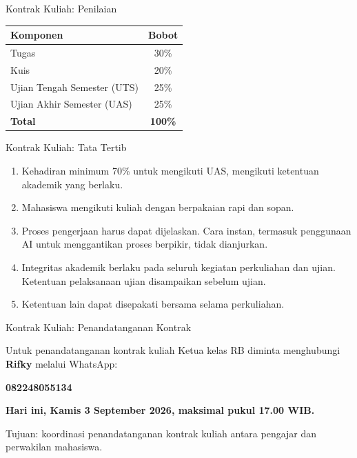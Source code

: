 \documentclass[aspectratio=169,11pt]{beamer}
\begin{document}
\begin{frame}{Kontrak Kuliah: Penilaian}
\begin{center}
\begin{tabular}{l c}
\toprule
\textbf{Komponen} & \textbf{Bobot} \\
\midrule
Tugas & 30\% \\
Kuis & 20\% \\
Ujian Tengah Semester (UTS) & 25\% \\
Ujian Akhir Semester (UAS) & 25\% \\
\midrule
\textbf{Total} & \textbf{100\%} \\
\bottomrule
\end{tabular}
\end{center}
\end{frame}

\begin{frame}{Kontrak Kuliah: Tata Tertib}
\begin{enumerate}
  \item Kehadiran minimum 70\% untuk mengikuti UAS, mengikuti ketentuan akademik yang berlaku.
  \item Mahasiswa mengikuti kuliah dengan berpakaian rapi dan sopan.
  \item Proses pengerjaan harus dapat dijelaskan. Cara instan, termasuk penggunaan AI untuk menggantikan proses berpikir, tidak dianjurkan.
  \item Integritas akademik berlaku pada seluruh kegiatan perkuliahan dan ujian. Ketentuan pelaksanaan ujian disampaikan sebelum ujian.
  \item Ketentuan lain dapat disepakati bersama selama perkuliahan.
\end{enumerate}
\end{frame}

\begin{frame}{Kontrak Kuliah: Penandatanganan Kontrak}
\begin{alertblock}{Untuk penandatanganan kontrak kuliah}
Ketua kelas RB diminta menghubungi \textbf{Rifky} melalui WhatsApp:
\begin{center}
{\Large\bfseries 082248055134}
\end{center}
\textbf{Hari ini, Kamis 3 September 2026, maksimal pukul 17.00 WIB.}
\end{alertblock}
\vspace{0.2cm}
Tujuan: koordinasi penandatanganan kontrak kuliah antara pengajar dan perwakilan mahasiswa.
\end{frame}
\end{document}
